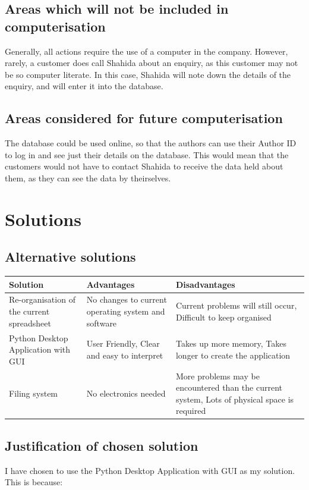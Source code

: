\subsection{Areas which will not be included in computerisation}
Generally, all actions require the use of a computer in the company. However, rarely, a customer does call Shahida about an enquiry, as this customer may not be so computer literate. In this case, Shahida will note down the details of the enquiry, and will enter it into the database.

\subsection{Areas considered for future computerisation}

The database could be used online, so that the authors can use their Author ID to log in and see just their details on the database. This would mean that the customers would not have to contact Shahida to receive the data held about them, as they can see the data by theirselves.

\section{Solutions}

\subsection{Alternative solutions}
\begin{center}
\begin{tabular}{|p{2.5cm}|p{3.5cm}|p{3.5cm}|}
    \hline
    \textbf{Solution} & \textbf{Advantages} & \textbf{Disadvantages} \\ \hline
    Re-organisation of the current spreadsheet & No changes to current operating system and software & Current problems will still occur, Difficult to keep organised \\ \hline
    Python Desktop Application with GUI & User Friendly, Clear and easy to interpret & Takes up more memory, Takes longer to create the application  \\ \hline
    Filing system & No electronics needed & More problems may be encountered than the current system, Lots of physical space is required \\ \hline
    \hline
\end{tabular}
\end{center}
\subsection{Justification of chosen solution}
I have chosen to use the Python Desktop Application with GUI as my solution. This is because:

